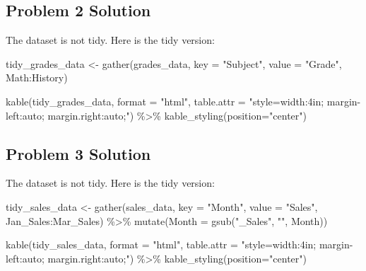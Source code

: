\documentclass[
  letterpaper,
  DIV=11,
  numbers=noendperiod]{scrreprt}
\newenvironment{Shaded}{\begin{snugshade}}{\end{snugshade}}
\newcommand{\AttributeTok}[1]{\textcolor[rgb]{0.40,0.45,0.13}{#1}}
\newcommand{\FunctionTok}[1]{\textcolor[rgb]{0.28,0.35,0.67}{#1}}
\newcommand{\NormalTok}[1]{\textcolor[rgb]{0.00,0.23,0.31}{#1}}
\newcommand{\OtherTok}[1]{\textcolor[rgb]{0.00,0.23,0.31}{#1}}
\newcommand{\SpecialCharTok}[1]{\textcolor[rgb]{0.37,0.37,0.37}{#1}}
\newcommand{\StringTok}[1]{\textcolor[rgb]{0.13,0.47,0.30}{#1}}
\begin{document}
\subsection*{Problem 2 Solution}\label{problem-2-solution}

The dataset is not tidy. Here is the tidy version:

\begin{Shaded}
\begin{Highlighting}[]
\NormalTok{tidy\_grades\_data }\OtherTok{\textless{}{-}} \FunctionTok{gather}\NormalTok{(grades\_data, }\AttributeTok{key =} \StringTok{"Subject"}\NormalTok{, }\AttributeTok{value =} \StringTok{"Grade"}\NormalTok{, Math}\SpecialCharTok{:}\NormalTok{History)}

\FunctionTok{kable}\NormalTok{(tidy\_grades\_data, }\AttributeTok{format =} \StringTok{"html"}\NormalTok{, }\AttributeTok{table.attr =} \StringTok{"style=\textquotesingle{}width:4in; margin{-}left:auto; margin.right:auto;\textquotesingle{}"}\NormalTok{)  }\SpecialCharTok{\%\textgreater{}\%}
  \FunctionTok{kable\_styling}\NormalTok{(}\AttributeTok{position=}\StringTok{"center"}\NormalTok{)}
\end{Highlighting}
\end{Shaded}

\subsection*{Problem 3 Solution}\label{problem-3-solution}

The dataset is not tidy. Here is the tidy version:

\begin{Shaded}
\begin{Highlighting}[]
\NormalTok{tidy\_sales\_data }\OtherTok{\textless{}{-}} \FunctionTok{gather}\NormalTok{(sales\_data, }\AttributeTok{key =} \StringTok{"Month"}\NormalTok{, }\AttributeTok{value =} \StringTok{"Sales"}\NormalTok{, Jan\_Sales}\SpecialCharTok{:}\NormalTok{Mar\_Sales) }\SpecialCharTok{\%\textgreater{}\%}
  \FunctionTok{mutate}\NormalTok{(}\AttributeTok{Month =} \FunctionTok{gsub}\NormalTok{(}\StringTok{"\_Sales"}\NormalTok{, }\StringTok{""}\NormalTok{, Month))}

\FunctionTok{kable}\NormalTok{(tidy\_sales\_data, }\AttributeTok{format =} \StringTok{"html"}\NormalTok{, }\AttributeTok{table.attr =} \StringTok{"style=\textquotesingle{}width:4in; margin{-}left:auto; margin.right:auto;\textquotesingle{}"}\NormalTok{)  }\SpecialCharTok{\%\textgreater{}\%}
  \FunctionTok{kable\_styling}\NormalTok{(}\AttributeTok{position=}\StringTok{"center"}\NormalTok{)}
\end{Highlighting}
\end{Shaded}
\end{document}
